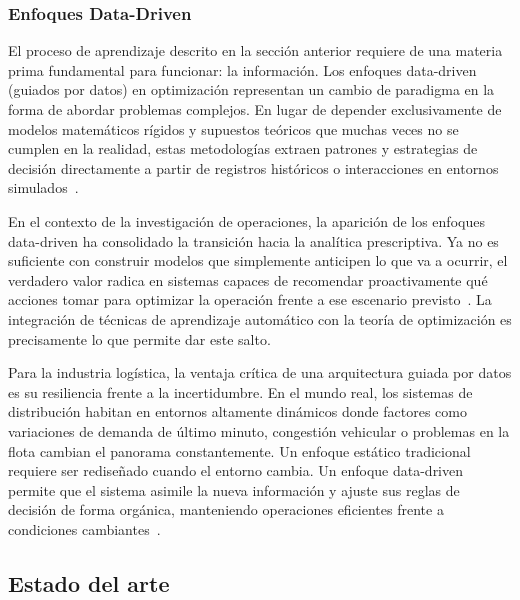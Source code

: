 \subsubsection{Enfoques Data-Driven} \label{sec:EnfoquesData-Driven}
El proceso de aprendizaje descrito en la sección anterior requiere de una materia prima fundamental para funcionar: la información. Los enfoques data-driven (guiados por datos) en optimización representan un cambio de paradigma en la forma de abordar problemas complejos. En lugar de depender exclusivamente de modelos matemáticos rígidos y supuestos teóricos que muchas veces no se cumplen en la realidad, estas metodologías extraen patrones y estrategias de decisión directamente a partir de registros históricos o interacciones en entornos simulados~\cite{bertsimas2018predictiveprescriptiveanalytics}.

En el contexto de la investigación de operaciones, la aparición de los enfoques data-driven ha consolidado la transición hacia la analítica prescriptiva. Ya no es suficiente con construir modelos que simplemente anticipen lo que va a ocurrir, el verdadero valor radica en sistemas capaces de recomendar proactivamente qué acciones tomar para optimizar la operación frente a ese escenario previsto~\cite{bertsimas2018predictiveprescriptiveanalytics}. La integración de técnicas de aprendizaje automático con la teoría de optimización es precisamente lo que permite dar este salto.

Para la industria logística, la ventaja crítica de una arquitectura guiada por datos es su resiliencia frente a la incertidumbre. En el mundo real, los sistemas de distribución habitan en entornos altamente dinámicos donde factores como variaciones de demanda de último minuto, congestión vehicular o problemas en la flota cambian el panorama constantemente. Un enfoque estático tradicional requiere ser rediseñado cuando el entorno cambia. Un enfoque data-driven permite que el sistema asimile la nueva información y ajuste sus reglas de decisión de forma orgánica, manteniendo operaciones eficientes frente a condiciones cambiantes~\cite{bertsimas2018predictiveprescriptiveanalytics}.

\subsection{Estado del arte} \label{Estadodelarte}

